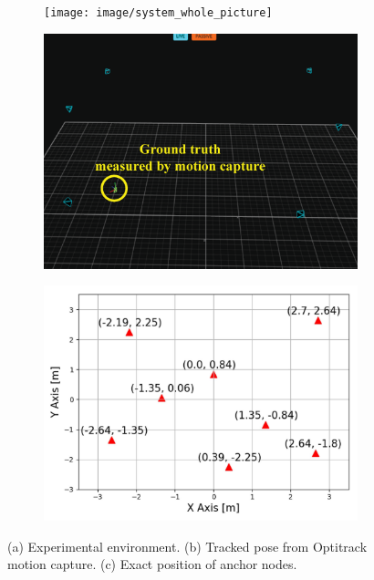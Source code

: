 \documentclass[letterpaper, 10 pt, conference]{ieeeconf}
\begin{document}
\begin{figure}[h]
	\centering
	\begin{subfigure}[b]{0.32\textwidth}
		\texttt{[image: image/system\_whole\_picture]}
		\caption{}
		\label{fig:whole_system}
	\end{subfigure}
	\begin{subfigure}[b]{0.32\textwidth}
		\includegraphics[width=\textwidth]{image/motion_capture}
		\caption{}
		\label{fig:Optitrack_figure}
	\end{subfigure}
	\begin{subfigure}[b]{0.32\textwidth}
		\includegraphics[width=\textwidth]{image/system_exact_position}
		\caption{}
		\label{fig:Exact_position}
	\end{subfigure}
	\caption{(a) Experimental environment. (b) Tracked pose from Optitrack motion capture. (c) Exact position of anchor nodes. }\label{fig:experimental_envorinment}
\end{figure}
\end{document}
